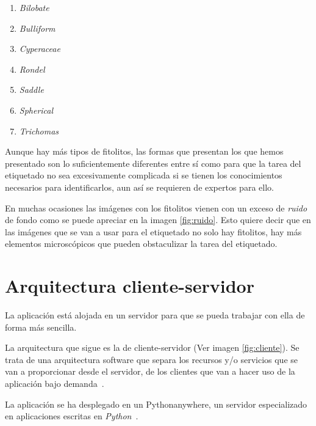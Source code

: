 \begin{enumerate}
	\item \textit{Bilobate}
	\item \textit{Bulliform}
	\item \textit{Cyperaceae}
	\item \textit{Rondel}
	\item \textit{Saddle}
	\item \textit{Spherical}
	\item \textit{Trichomas}
\end{enumerate}


Aunque hay más tipos de fitolitos, las formas que presentan los que hemos presentado son lo suficientemente diferentes entre sí como para que la tarea del etiquetado no sea excesivamente complicada si se tienen los conocimientos necesarios para identificarlos, aun así se requieren de expertos para ello.

En muchas ocasiones las imágenes con los fitolitos vienen con un exceso de \textit{ruido} de fondo como se puede apreciar en la imagen \ref{fig:ruido}. Esto quiere decir que en las imágenes que se van a usar para el etiquetado no solo hay fitolitos, hay más elementos microscópicos que pueden obstaculizar la tarea del etiquetado.


\section{Arquitectura cliente-servidor}

La aplicación está alojada en un servidor para que se pueda trabajar con ella de forma más sencilla.

La arquitectura que sigue es la de cliente-servidor (Ver imagen \ref{fig:cliente}). Se trata de una arquitectura software que separa los recursos y/o servicios que se van a proporcionar desde el servidor, de los clientes que van a hacer uso de la aplicación bajo demanda~\cite{cliente}.




La aplicación se ha desplegado en un Pythonanywhere, un servidor especializado en aplicaciones escritas en \textit{Python}~\cite{servidor}.

